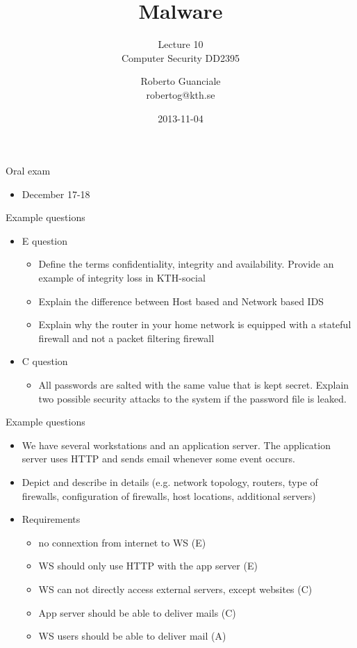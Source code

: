 \documentclass{beamer}
\title{Malware}
\subtitle{Lecture 10 \\ Computer Security DD2395}
\author[R. Guanciale]{
  Roberto Guanciale\\
  robertog@kth.se
}
\date{2013-11-04}
\begin{document}
\begin{frame}[plain]
  \titlepage
\end{frame}

\begin{frame}{Oral exam}
  \begin{itemize}
  \item December 17-18
  \end{itemize}
\end{frame}

\begin{frame}{Example questions}
  \begin{itemize}
  \item E question
    \begin{itemize}
    \item Define the terms confidentiality, integrity and availability.
      Provide an example of integrity loss in KTH-social
    \item Explain the difference between Host based and Network based IDS
    \item Explain why the router in your home network is equipped with a
      stateful firewall and not a packet filtering firewall
    \end{itemize}
  \item C question
    \begin{itemize}
    \item All passwords are salted with the same value that is kept secret. Explain two
      possible security attacks to the system if the password file is leaked.
    \end{itemize}
  \end{itemize}
\end{frame}

\begin{frame}{Example questions}
  \begin{itemize}
   \item We have several workstations and an application server.
    The application server uses HTTP and sends email whenever some event occurs.
  \item Depict and describe in details (e.g. network topology,
    routers, type of firewalls, configuration of firewalls, host locations, additional
    servers)
  \item Requirements
    \begin{itemize}
    \item no connextion from internet to WS (E)
    \item WS should only use HTTP with the app server (E)
    \item WS can not directly access external servers, except websites (C)
    \item App server should be able to deliver mails (C)
    \item WS users should be able to deliver mail (A)
    \end{itemize}
  \end{itemize}
\end{frame}
\end{document}
